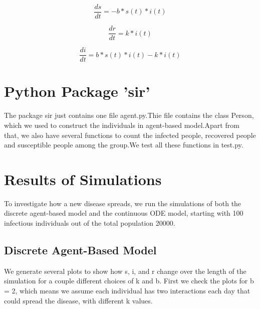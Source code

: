 \documentclass{article}
\begin{document}
$$\frac{ds}{dt} = -b * s(t) * i(t)$$

$$\frac{dr}{dt} = k * i(t)$$

$$\frac{di}{dt} = b * s(t) * i(t) - k * i(t)$$




\section{Python Package 'sir'}
  The package sir just contains one file agent.py.Thie file contains the class Person, which we used to construct the individuals in agent-based model.Apart from that, we also have several functions to count the infected people, recovered people and susceptible people among the group.We test all these functions in test.py.










\section{Results of Simulations}

To investigate how a new disease spreads, we run the simulations of both the discrete agent-based model and the continuous ODE model, starting with 100 infectious individuals out of the total population 20000.




\subsection{Discrete Agent-Based Model}

We generate several plots to show how s, i, and r change over the length of the simulation for a couple different choices of k and b. First we check the plots for b = 2, which means we assume each individual has two interactions each day that could spread the disease, with different k values.
\end{document}
